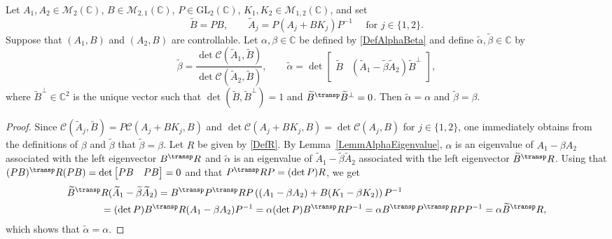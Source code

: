 \begin{lemm}
\label{LemmAlphaBetaInvariant}
Let $A_1, A_2 \in \mathcal M_2(\mathbb C)$, $B \in \mathcal M_{2, 1}(\mathbb C)$, $P \in \mathrm{GL}_2(\mathbb C)$, $K_1, K_2 \in \mathcal M_{1, 2}(\mathbb C)$, and set
\[
\widetilde B = P B, \qquad \widetilde A_j = P (A_j + B K_j) P^{-1} \quad \text{ for } j \in \{1, 2\}.
\]
Suppose that $(A_1, B)$ and $(A_2, B)$ are controllable. Let $\alpha, \beta \in \mathbb C$ be defined by \eqref{DefAlphaBeta} and define $\widetilde\alpha, \widetilde\beta \in \mathbb C$ by
\[
\widetilde\beta = \frac{\det \mathcal C(\widetilde A_1, \widetilde B)}{\det \mathcal C(\widetilde A_2, \widetilde B)}, \qquad \widetilde\alpha = \det \begin{bmatrix}\widetilde B & (\widetilde A_1 - \widetilde \beta \widetilde A_2) \widetilde B^\perp\end{bmatrix},
\]
where $\widetilde B^\perp \in \mathbb C^2$ is the unique vector such that $\det(\widetilde B, \widetilde B^\perp) = 1$ and $\widetilde B^\transp \widetilde B^\perp = 0$. Then $\widetilde\alpha = \alpha$ and $\widetilde\beta = \beta$.
\end{lemm}

\begin{proof}
Since $\mathcal C(\widetilde A_j, \widetilde B) = P \mathcal C(A_j + B K_j, B)$ and $\det \mathcal C(A_j + B K_j, B) = \det \mathcal C(A_j, B)$ for $j \in \{1, 2\}$, one immediately obtains from the definitions of $\beta$ and $\widetilde\beta$ that $\widetilde\beta = \beta$. Let $R$ be given by \eqref{DefR}. By Lemma~\ref{LemmAlphaEigenvalue}, $\alpha$ is an eigenvalue of $A_1 - \beta A_2$ associated with the left eigenvector $B^\transp R$ and $\widetilde\alpha$ is an eigenvalue of $\widetilde A_1 - \widetilde\beta \widetilde A_2$ associated with the left eigenvector $\widetilde B^\transp R$. Using that $(P B)^\transp R (P B) = \det\begin{bmatrix}PB & PB\\\end{bmatrix} = 0$ and that $P^\transp R P = (\det P) R$, we get
\begin{align*}
\widetilde B^\transp &R (\widetilde A_1 - \widetilde\beta \widetilde A_2)  = B^\transp P^\transp R P \left((A_1 - \beta A_2) + B(K_1 - \beta K_2)\right) P^{-1}\\
&= (\det P) B^\transp R (A_1 - \beta A_2) P^{-1}
= \alpha (\det P) B^\transp R P^{-1} = \alpha B^\transp P^\transp R P P^{-1} = \alpha \widetilde B^\transp R,
\end{align*}
which shows that $\widetilde\alpha = \alpha$.
\end{proof}

